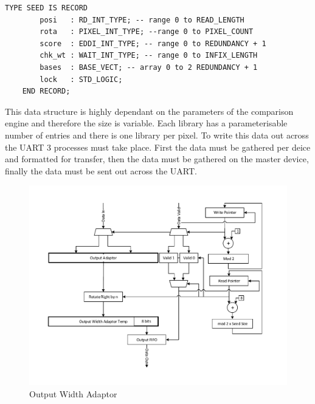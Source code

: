  \begin{center}

 \begin{minipage}{\textwidth}
\lstset{language=python, numbers=left, showspaces=false,
    showstringspaces=false, tabsize=4, breaklines=true, captionpos=b, numbersep=5pt }
\begin{lstlisting}[frame=single,caption=Result Data Format, label=listing:record]
	TYPE SEED IS RECORD
		posi   : RD_INT_TYPE; -- range 0 to READ_LENGTH
		rota   : PIXEL_INT_TYPE; --range 0 to PIXEL_COUNT
		score  : EDDI_INT_TYPE; -- range 0 to REDUNDANCY + 1
		chk_wt : WAIT_INT_TYPE; -- range 0 to INFIX_LENGTH
		bases  : BASE_VECT; -- array 0 to 2 REDUNDANCY + 1
		lock   : STD_LOGIC; 
	END RECORD;
\end{lstlisting}
 \end{minipage}
\end{center}
This data structure is highly dependant on the parameters of the comparison engine and therefore the size is variable. Each library has a parameterisable number of entries and there is one library per pixel. To write this data out across the UART 3 processes must take place. First the data must be gathered per deice and formatted for transfer, then the data must be gathered on the master device, finally the data must be sent out across the UART.
\begin{figure}[!h]
  \centering
  \includegraphics[width=\textwidth]{./figs/output_adaptor.pdf}
  \caption{Output Width Adaptor}
  \label{fig:owa}
\end{figure}

